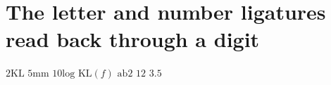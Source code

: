 \documentclass{article}
\begin{document}
\section{The letter and number ligatures read back through a digit}
$2\mathrm{KL}$ $5\mathrm{mm}$ $10\mathrm{log}$ $\mathrm{KL}(f)$ $\mathrm{ab}2$ $1\mathrm{2}$ $3.\mathrm{5}$

\end{document}
